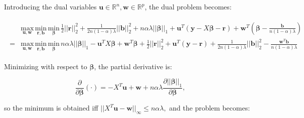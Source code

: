 Introducing the dual variables $\boldsymbol u\in\mathbb{R}^{n},\boldsymbol w\in\mathbb{R}^p$, the dual problem becomes:

\begin{gather}
    \label{eq:dual+uw}
    \begin{aligned}
        &\underset{\boldsymbol u,\boldsymbol w}{\mathrm{max}}\,\underset{\boldsymbol r,\boldsymbol b}{\mathrm{min}}\,\underset{\boldsymbol\beta}{\mathrm{min}}\,\frac{1}{2}||\boldsymbol r||_2^2+\frac{1}{2n(1-\alpha)\lambda}||\boldsymbol b||_2^2+n\alpha\lambda||\boldsymbol\beta||_1+\boldsymbol u^T(\boldsymbol y-X\boldsymbol\beta-\boldsymbol r)+\boldsymbol w^T\left(\boldsymbol\beta-\frac{\boldsymbol b}{n(1-\alpha)\lambda}\right)\\
        =&\underset{\boldsymbol u,\boldsymbol w}{\mathrm{max}}\,\underset{\boldsymbol r,\boldsymbol b}{\mathrm{min}}\,\underset{\boldsymbol\beta}{\mathrm{min}}\,n\alpha\lambda||\boldsymbol\beta||_1-\boldsymbol u^TX\boldsymbol\beta+\boldsymbol w^T\boldsymbol\beta+\frac{1}{2}||\boldsymbol r||_2^2+\boldsymbol u^T(\boldsymbol y-\boldsymbol r)+\frac{1}{2n(1-\alpha)\lambda}||\boldsymbol b||_2^2-\frac{\boldsymbol w^T\boldsymbol b}{n(1-\alpha)\lambda}
    \end{aligned}    
\end{gather}


Minimizing with respect to $\boldsymbol\beta$, the partial derivative is:

\begin{equation}
    \label{eq:partialbeta}
    \frac{\partial}{\partial\boldsymbol\beta}(\cdot) =-X^T\boldsymbol u+\boldsymbol w+n\alpha\lambda\frac{\partial||\boldsymbol\beta||_1}{\partial\boldsymbol\beta},
\end{equation}

so the minimum is obtained iff $||X^T\boldsymbol u-\boldsymbol w||_\infty\leq n\alpha\lambda,$ and the problem becomes:

